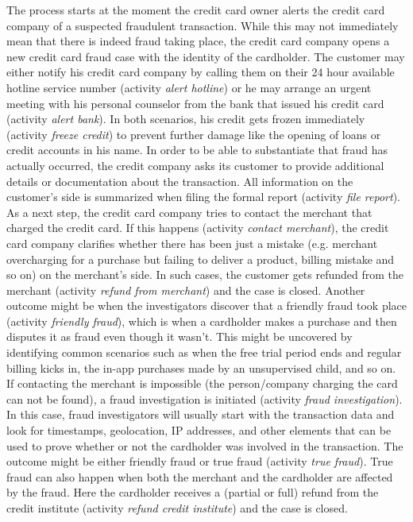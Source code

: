 The process starts at the moment the credit card owner alerts the credit card company of a suspected fraudulent transaction.
While this may not immediately mean that there is indeed fraud taking place, the credit card company opens a new credit card fraud case with the identity of the cardholder.
The customer may either notify his credit card company by calling them on their 24 hour available hotline service number (activity \textit{alert hotline}) or he may arrange an urgent meeting with his personal counselor from the bank that issued his credit card (activity \textit{alert bank}).
In both scenarios, his credit gets frozen immediately (activity \textit{freeze credit}) to prevent further damage like the opening of loans or credit accounts in his name.
In order to be able to substantiate that fraud has actually occurred, the credit company asks its customer to provide additional details or documentation about the transaction. 
All information on the customer's side is summarized when filing the formal report (activity \textit{file report}).
As a next step, the credit card company tries to contact the merchant that charged the credit card.
If this happens (activity \textit{contact merchant}), the credit card company clarifies whether there has been just a mistake (e.g. merchant overcharging for a purchase but failing to deliver a product, billing mistake and so on) on the merchant's side. 
In such cases, the customer gets refunded from the merchant (activity \textit{refund from merchant}) and the case is closed.
Another outcome might be when the investigators discover that a friendly fraud took place (activity \textit{friendly fraud}), which is when a cardholder makes a purchase and then disputes it as fraud even though it wasn't.
This might be uncovered by identifying common scenarios such as when the free trial period ends and regular billing kicks in, the in-app purchases made by an unsupervised child, and so on. 
If contacting the merchant is impossible (the person/company charging the card can not be found), a fraud investigation is initiated (activity \textit{fraud investigation}).
In this case, fraud investigators will usually start with the transaction data and look for timestamps, geolocation, IP addresses, and other elements that can be used to prove whether or not the cardholder was involved in the transaction.
The outcome might be either friendly fraud or true fraud (activity \textit{true fraud}).
True fraud can also happen when both the merchant and the cardholder are affected by the fraud.
Here the cardholder receives a (partial or full) refund from the credit institute (activity \textit{refund credit institute}) and the case is closed.


